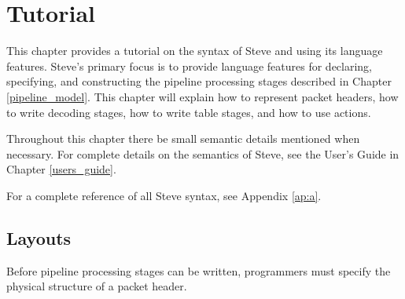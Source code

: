 \chapter{Tutorial} \label{tutorial}

This chapter provides a tutorial on the syntax of Steve and using its language features. Steve's primary focus is to provide language features for declaring, specifying, and constructing the pipeline processing stages described in Chapter \ref{pipeline_model}. This chapter will explain how to represent packet headers, how to write decoding stages, how to write table stages, and how to use actions.

Throughout this chapter there be small semantic details mentioned when necessary. For complete details on the semantics of Steve, see the User's Guide in Chapter \ref{users_guide}.

For a complete reference of all Steve syntax, see Appendix \ref{ap:a}.

\section{Layouts} \label{Layout_tut}

Before pipeline processing stages can be written, programmers must specify the physical structure of a packet header. 

